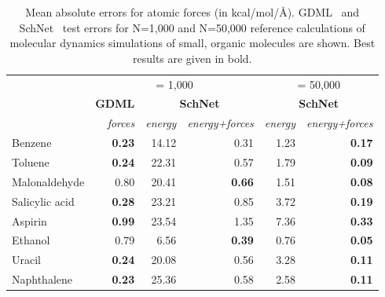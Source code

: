 \documentclass[aip,jcp,reprint,graphicx]{revtex4-1}
\begin{document}
\begin{table*}
	\caption{\label{tab:mdforces}Mean absolute errors for atomic forces (in kcal/mol/\AA). GDML~\citep{chmiela2017machine} and SchNet~\citep{schutt2017schnet} test errors for N=1,000 and N=50,000 reference calculations of molecular dynamics simulations of small, organic molecules are shown. Best results are given in bold.}
	\begin{ruledtabular}
		\begin{tabular}{lrrrrr}
			                                 &                       \multicolumn{3}{c}{ = 1,000}                        &              \multicolumn{2}{c}{ = 50,000}              \\ \cline{2-4}\cline{5-6}
			                                 &   \textbf{GDML} &            \multicolumn{2}{c}{\textbf{SchNet}}             &            \multicolumn{2}{c}{\textbf{SchNet}}             \\ \cline{2-2}\cline{3-4} \cline{5-6}
			\raggedleft{\textit{trained on}} & \textit{forces} & \textit{energy} & \textit{energy+forces} &  \textit{energy} & \textit{energy+forces}  \\ \hline
			Benzene                          &   \textbf{0.23} &           14.12 &                   0.31 &                       1.23 &          \textbf{0.17}  \\
			Toluene                          &   \textbf{0.24} &           22.31 &                   0.57 &                          1.79 &          \textbf{0.09}   \\
			Malonaldehyde                    &            0.80 &           20.41 &          \textbf{0.66} &                           1.51 &          \textbf{0.08}   \\
			Salicylic acid                   &   \textbf{0.28} &           23.21 &                   0.85 &                           3.72 &          \textbf{0.19}   \\
			Aspirin                          &   \textbf{0.99} &           23.54 &                   1.35 &                           7.36 &          \textbf{0.33}   \\
			Ethanol                          &            0.79 &            6.56 &          \textbf{0.39} &                           0.76 &          \textbf{0.05}   \\
			Uracil                           &   \textbf{0.24} &           20.08 &                   0.56 &                           3.28 &          \textbf{0.11}   \\
			Naphthalene                       &   \textbf{0.23} &           25.36 &                   0.58 &                           2.58 &          \textbf{0.11} 
		\end{tabular}
	\end{ruledtabular}
\end{table*}
\end{document}
